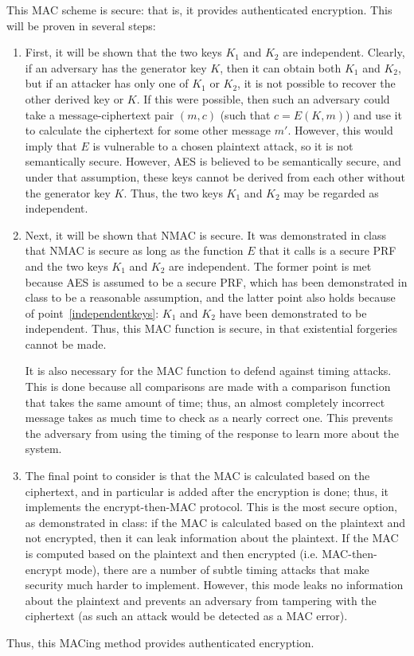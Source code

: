 \documentclass{amsart}
\begin{document}
This MAC scheme is secure: that is, it provides authenticated encryption. This will be proven in several steps:
\begin{enumerate}
\item\label{independentkeys} First, it will be shown that the two keys $K_1$ and $K_2$ are independent. Clearly, if an adversary has the generator key $K$, then it can obtain both $K_1$ and $K_2$, but if an attacker has only one of $K_1$ or $K_2$, it is not possible to recover the other derived key or $K$. If this were possible, then such an adversary could take a message-ciphertext pair $(m,c)$ (such that $c = E(K,m)$) and use it to calculate the ciphertext for some other message $m'$. However, this would imply that $E$ is vulnerable to a chosen plaintext attack, so it is not semantically secure. However, AES is believed to be semantically secure, and under that assumption, these keys cannot be derived from each other without the generator key $K$. Thus, the two keys $K_1$ and $K_2$ may be regarded as independent.
\item Next, it will be shown that NMAC is secure. It was demonstrated in class that NMAC is secure as long as the function $E$ that it calls is a secure PRF and the two keys $K_1$ and $K_2$ are independent. The former point is met because AES is assumed to be a secure PRF, which has been demonstrated in class to be a reasonable assumption, and the latter point also holds because of point~\ref{independentkeys}: $K_1$ and $K_2$ have been demonstrated to be independent. Thus, this MAC function is secure, in that existential forgeries cannot be made.

  It is also necessary for the MAC function to defend against timing attacks. This is done because all comparisons are made with a comparison function that takes the same amount of time; thus, an almost completely incorrect message takes as much time to check as a nearly correct one. This prevents the adversary from using the timing of the response to learn more about the system.
\item The final point to consider is that the MAC is calculated based on the ciphertext, and in particular is added after the encryption is done; thus, it implements the encrypt-then-MAC protocol. This is the most secure option, as demonstrated in class: if the MAC is calculated based on the plaintext and not encrypted, then it can leak information about the plaintext. If the MAC is computed based on the plaintext and then encrypted (i.e. MAC-then-encrypt mode), there are a number of subtle timing attacks that make security much harder to implement. However, this mode leaks no information about the plaintext and prevents an adversary from tampering with the ciphertext (as such an attack would be detected as a MAC error).
\end{enumerate}
Thus, this MACing method provides authenticated encryption.
\end{document}
